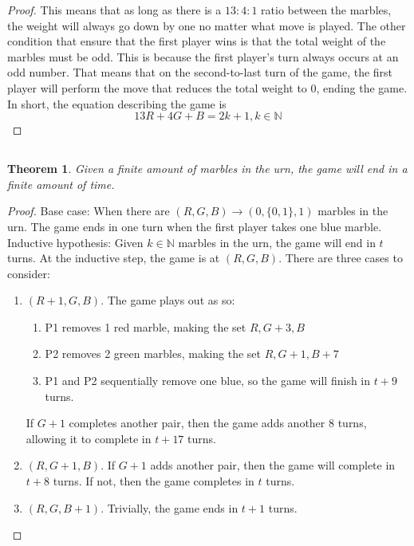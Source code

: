 \documentclass{article}
\newtheorem{theorem}{Theorem}
\newcommand{\N}{\mathbb{N}}
\begin{document}
\begin{proof}
    This means that as long as there is a \(13:4:1\) ratio between the marbles, the weight will always go down by one no matter what move is played.
    The other condition that ensure that the first player wins is that the total weight of the marbles must be odd.
    This is because the first player's turn always occurs at an odd number.
    That means that on the second-to-last turn of the game, the first player will perform the move that reduces the total weight to \(0\), ending the game.
    In short, the equation describing the game is
    \begin{equation}
        13R + 4G + B = 2k + 1, k \in \N
    \end{equation}
\end{proof}

\subsection{}

\begin{theorem}
    Given a finite amount of marbles in the urn, the game will end in a finite amount of time.
\end{theorem}
\begin{proof}
    Base case: When there are \((R, G, B) \to (0, \{0, 1\}, 1)\) marbles in the urn.
    The game ends in one turn when the first player takes one blue marble.
    Inductive hypothesis: Given \(k \in \N\) marbles in the urn, the game will end in \(t\) turns.
    At the inductive step, the game is at \((R, G, B)\).
    There are three cases to consider:
    \begin{enumerate}
        \item \((R + 1, G, B)\).
        The game plays out as so:
        \begin{enumerate}
            \item P1 removes 1 red marble, making the set \(R, G + 3, B\)
            \item P2 removes 2 green marbles, making the set \(R, G + 1, B + 7\)
            \item P1 and P2 sequentially remove one blue, so the game will finish in \(t + 9\) turns.
        \end{enumerate}
        If \(G + 1\) completes another pair, then the game adds another \(8\) turns, allowing it to complete in \(t + 17\) turns.
        \item \((R, G + 1, B)\).
        If \(G + 1\) adds another pair, then the game will complete in \(t + 8\) turns.
        If not, then the game completes in \(t\) turns.
        \item \((R, G, B + 1)\).
        Trivially, the game ends in \(t + 1\) turns.
    \end{enumerate}
\end{proof}
\end{document}
